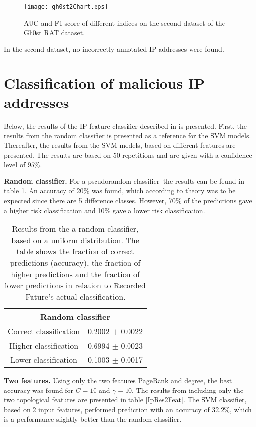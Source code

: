 \begin{figure}[h!]
    \centering
    \texttt{[image: gh0st2Chart.eps]}
    \caption{AUC and F1-score of different indices on the second dataset of the Gh0st RAT dataset.}
    \label{gh0stChart2}
\end{figure}

In the second dataset, no incorrectly annotated IP addresses were found. 

\nopagebreak
\FloatBarrier
\section{Classification of malicious IP addresses}
Below, the results of the IP feature classifier described in  is presented. First, the results from the random classifier is presented as a reference for the SVM models. Thereafter, the results from the SVM models, based on different features are presented. The results are based on 50 repetitions and are given with a confidence level of 95\%.

\textbf{Random classifier.} For a pseudorandom classifier, the results can be found in table \ref{randClass}. An accuracy of 20\% was found, which according to theory was to be expected since there are 5 difference classes. However, 70\% of the predictions gave a higher risk classification and 10\% gave a lower risk classification.

\begin{table}[h!]
    \centering
    \caption{Results from the a random classifier, based on a uniform distribution. The table shows the fraction of correct predictions (accuracy), the fraction of higher predictions and the fraction of lower predictions in relation to Recorded Future's actual classification.}
    \begin{tabular}{|c|c|}
    \hline
        \multicolumn{2}{|c|}{Random classifier}\\ \hline
        Correct classification & 0.2002 $\pm$ 0.0022 \\
        Higher classification  & 0.6994 $\pm$ 0.0023\\
        Lower classification   & 0.1003 $\pm$ 0.0017\\ \hline
    \end{tabular}
    \label{randClass}
\end{table}



\textbf{Two features.} Using only the two features PageRank and degree, the best accuracy was found for $C=10$ and $\gamma=10$. The results from including only the two topological features are presented in table \ref{IpRes2Feat}. The SVM classifier, based on 2 input features, performed prediction with an accuracy of 32.2\%, which is a performance slightly better than the random classifier.

